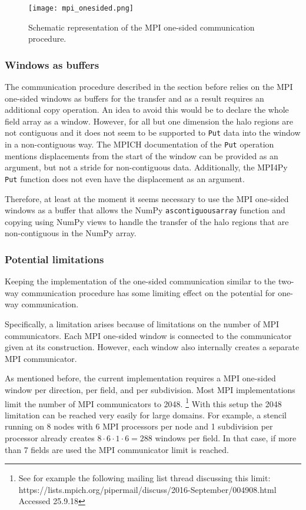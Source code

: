 \begin{figure}
\centering
\texttt{[image: mpi\_onesided.png]}
\caption{Schematic representation of the MPI one-sided communication procedure.}
\label{fig:mpi_onesided_communication_flow}
\end{figure}

\subsubsection{Windows as buffers}
The communication procedure described in the section before relies on the MPI one-sided windows as buffers for the transfer and as a result requires an additional copy operation.
An idea to avoid this would be to declare the whole field array as a window.
However, for all but one dimension the halo regions are not contiguous and it does not seem to be supported to \texttt{Put} data into the window in a non-contiguous way.
The MPICH documentation of the \texttt{Put} operation mentions displacements from the start of the window can be provided as an argument, but not a stride for non-contiguous data.
Additionally, the MPI4Py \texttt{Put} function does not even have the displacement as an argument.

Therefore, at least at the moment it seems necessary to use the MPI one-sided windows as a buffer that allows the NumPy \texttt{ascontiguousarray} function and copying using NumPy views to handle the transfer of the halo regions that are non-contiguous in the NumPy array.

\subsubsection{Potential limitations}
Keeping the implementation of the one-sided communication similar to the two-way communication procedure has some limiting effect on the potential for one-way communication.

Specifically, a limitation arises because of limitations on the number of MPI communicators.
Each MPI one-sided window is connected to the communicator given at its construction.
However, each window also internally creates a separate MPI communicator.

As mentioned before, the current implementation requires a MPI one-sided window per direction, per field, and per subdivision.
Most MPI implementations limit the number of MPI communicators to 2048. 
\footnote{See for example the following mailing list thread discussing this limit: https://lists.mpich.org/pipermail/discuss/2016-September/004908.html Accessed 25.9.18}
With this setup the 2048 limitation can be reached very easily for large domains.
For example, a stencil running on 8 nodes with 6 MPI processors per node and 1 subdivision per processor already creates $8 \cdot 6 \cdot 1 \cdot 6 = 288$ windows per field.
In that case, if more than 7 fields are used the MPI communicator limit is reached.

